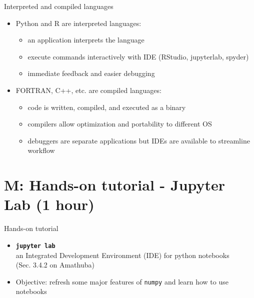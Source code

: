 \documentclass[english,aspectratio=169]{beamer}
\begin{document}
\begin{frame}{Interpreted and compiled languages}
\begin{itemize}
    \item Python and R are interpreted languages:
    \begin{itemize}
        \item an application interprets the language
        \item execute commands interactively with IDE (RStudio, jupyterlab, spyder)
        \item immediate feedback and easier debugging
    \end{itemize}
    \item FORTRAN, C++, etc. are compiled languages:
    \begin{itemize}
        \item code is written, compiled, and executed as a binary
        \item compilers allow optimization and portability to different OS
        \item debuggers are separate applications but IDEs are available to streamline workflow
    \end{itemize}
\end{itemize}
\end{frame}


\section{M: Hands-on tutorial - Jupyter Lab (1 hour)}
\begin{frame}{Hands-on tutorial}
    \begin{itemize}
    \item \textbf{\texttt{jupyter lab}}\\ an  Integrated Development Environment (IDE) for python notebooks \\(Sec. 3.4.2 on Amathuba)
    \item Objective: refresh some major features of \texttt{numpy} and learn how to use notebooks
    \end{itemize}
     
\end{frame}

\end{document}
